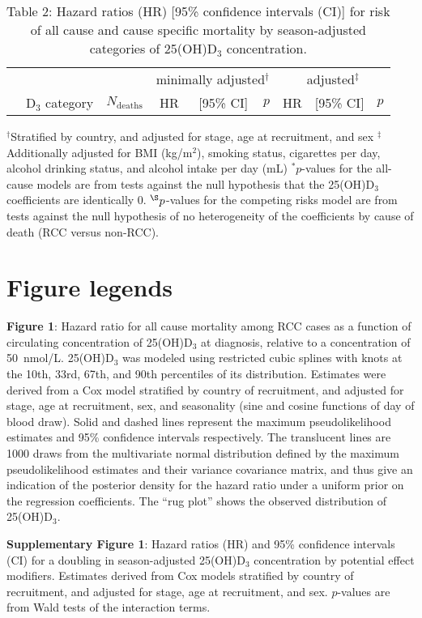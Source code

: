 \documentclass[a4paper,11pt]{article}
\begin{document}
\clearpage 
\begin{table}
\caption{Table 2: Hazard ratios (HR) [95\% confidence intervals (CI)] for risk of 
all cause and cause specific mortality by season-adjusted categories of 25(OH)D$_3$ 
concentration.}
\begin{tabular}{lrrrrrrrr}
\toprule
& & &\multicolumn{3}{c}{minimally adjusted$^\dag$} & 
\multicolumn{3}{c}{adjusted$^\ddag$} \\
 \cmidrule(r){4-6} \cmidrule(l){7-9} 
& D$_3$ category & $N_{\text{deaths}}$ & HR & [95\% CI] & $p$ & HR & [95\% CI] 
& 
$p$ \\
\midrule

\bottomrule
\end{tabular}
\newline
{\footnotesize 
$^\dag$Stratified by country, and adjusted for stage, age at recruitment, and 
sex \newline
$^\ddag$Additionally adjusted for BMI (kg/m$^2$), smoking status, cigarettes 
per day, alcohol drinking status, and alcohol intake per day (mL) \newline
$^*p$-values for the all-cause models are from tests against the null 
hypothesis that the 25(OH)D$_3$ coefficients are identically 0. 
\newline
$^{\S}p$-values for the competing risks model are from tests against the null 
hypothesis of no heterogeneity of the coefficients by cause of death (RCC 
versus non-RCC).
}
\end{table}
\clearpage

\section*{Figure legends}
\noindent \textbf{Figure 1}: Hazard ratio for all cause mortality among RCC cases as 
a function of circulating concentration of 25(OH)D$_3$ at diagnosis, relative to a 
concentration of 50~nmol/L. 25(OH)D$_3$ was modeled using restricted cubic splines 
with knots at the 10th, 33rd, 67th, and 90th percentiles of its distribution. 
Estimates were derived from a Cox model stratified by country of recruitment, and 
adjusted for stage, age at recruitment, sex, and seasonality (sine and cosine 
functions of day of blood draw). Solid and dashed lines represent the maximum 
pseudolikelihood estimates and 95\% confidence intervals respectively. The 
translucent lines are 1000 draws from the multivariate normal distribution defined 
by the maximum pseudolikelihood estimates and their variance covariance matrix, and 
thus give an indication of the posterior density for the hazard ratio under a 
uniform prior on the regression coefficients. The ``rug plot'' shows the observed 
distribution of 25(OH)D$_3$.


\noindent \textbf{Supplementary Figure 1}: Hazard ratios (HR) and 95\% confidence 
intervals (CI) for a doubling in season-adjusted 25(OH)D$_3$ concentration by 
potential effect modifiers. \footnotesize{Estimates derived from Cox models 
stratified by country of recruitment, and adjusted for stage, age at recruitment, 
and sex. $p$-values are from Wald tests of the interaction terms.} 
\end{document}
